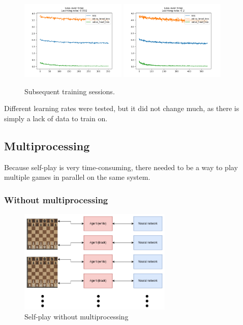\documentclass{article}
\begin{document}
\begin{figure}[H]
    \centering
    \includegraphics[width=0.45\textwidth]{img/plots/loss-2022-04-14_20:31:55.png}
    \includegraphics[width=0.45\textwidth]{img/plots/loss-2022-04-17_20:06:09.png}
    \caption{Subsequent training sessions.}
\end{figure}

Different learning rates were tested, but it did not change much, 
as there is simply a lack of data to train on.


\subsection{Multiprocessing}

Because self-play is very time-consuming, there needed to be a way to play multiple games in parallel 
on the same system.

\subsubsection{Without multiprocessing}

\begin{figure}[H]
    \centering
    \includegraphics[width=0.65\textwidth]{img/without-multiprocessing.png}
    \caption{Self-play without multiprocessing}
\end{figure}
\end{document}

